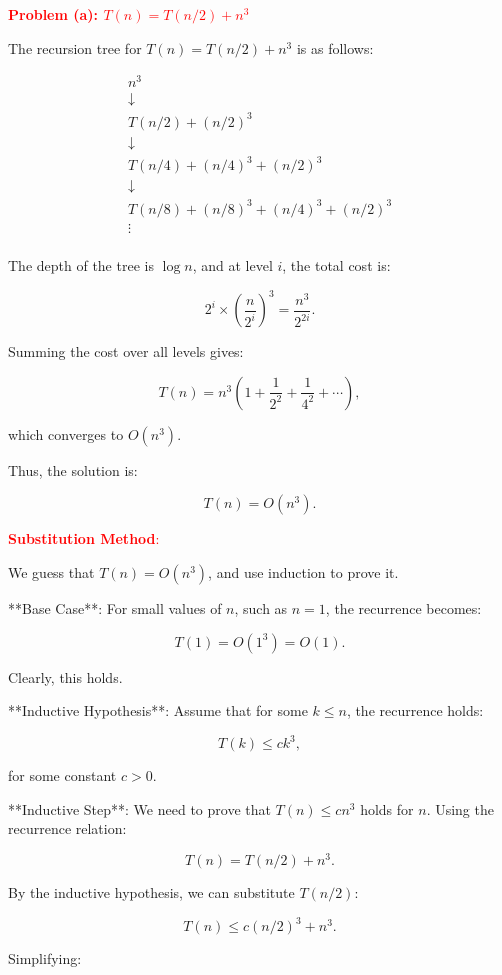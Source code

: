 \documentclass[10pt,letter,notitlepage]{article}
\begin{document}
\begin{Answer}
\textcolor{red}{\textbf{Problem (a): \( T(n) = T(n/2) + n^3 \)}}

The recursion tree for \( T(n) = T(n/2) + n^3 \) is as follows:

\[
\begin{array}{c}
n^3 \\
\downarrow \\
T(n/2) + (n/2)^3 \\
\downarrow \\
T(n/4) + (n/4)^3 + (n/2)^3 \\
\downarrow \\
T(n/8) + (n/8)^3 + (n/4)^3 + (n/2)^3 \\
\vdots \\
\end{array}
\]

The depth of the tree is \( \log n \), and at level \( i \), the total cost is:

\[
2^i \times \left( \frac{n}{2^i} \right)^3 = \frac{n^3}{2^{2i}}.
\]

Summing the cost over all levels gives:

\[
T(n) = n^3 \left( 1 + \frac{1}{2^2} + \frac{1}{4^2} + \cdots \right),
\]

which converges to \( O(n^3) \).

Thus, the solution is:

\[
T(n) = O(n^3).
\]

\textcolor{red}{\textbf{Substitution Method}:}

We guess that \( T(n) = O(n^3) \), and use induction to prove it.

**Base Case**: For small values of \( n \), such as \( n = 1 \), the recurrence becomes:

\[
T(1) = O(1^3) = O(1).
\]

Clearly, this holds.

**Inductive Hypothesis**: Assume that for some \( k \leq n \), the recurrence holds:

\[
T(k) \leq c k^3,
\]

for some constant \( c > 0 \).

**Inductive Step**: We need to prove that \( T(n) \leq c n^3 \) holds for \( n \). Using the recurrence relation:

\[
T(n) = T(n/2) + n^3.
\]

By the inductive hypothesis, we can substitute \( T(n/2) \):

\[
T(n) \leq c (n/2)^3 + n^3.
\]

Simplifying:


\end{Answer}
\end{document}

